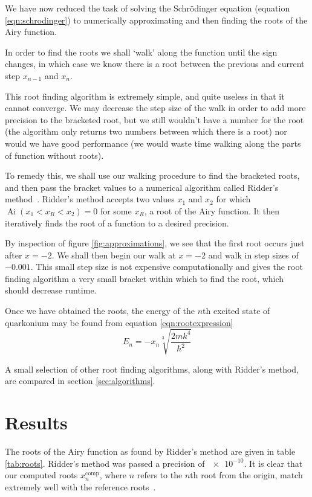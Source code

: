 \documentclass[]{article}
\newcommand{\Ai}[1]{\ensuremath{\operatorname{Ai}({#1})}}
\begin{document}
We have now reduced the task of solving the Schr\"{o}dinger equation (equation \ref{eqn:schrodinger}) to numerically approximating and then finding the roots of the Airy function.

In order to find the roots we shall `walk' along the function until the sign changes, in which case we know there is a root between the previous and current step $x_{n-1}$ and $x_{n}$.

This root finding algorithm is extremely simple, and quite useless in that it cannot converge. We may decrease the step size of the walk in order to add more precision to the bracketed root, but we still wouldn't have a number for the root (the algorithm only returns two numbers between which there is a root) nor would we have good performance (we would waste time walking along the parts of function without roots).

To remedy this, we shall use our walking procedure to find the bracketed roots, and then pass the bracket values to a numerical algorithm called Ridder's method~\cite{ref:nr}. Ridder's method accepts two values $x_{1}$ and $x_{2}$ for which $\Ai{x_{1} < x_{R} < x_{2}} = 0$ for some $x_{R}$, a root of the Airy function. It then iteratively finds the root of a function to a desired precision.

By inspection of figure \ref{fig:approximations}, we see that the first root occurs just after $x = -2$. We shall then begin our walk at $x = -2$ and walk in step sizes of $-0.001$. This small step size is not expensive computationally and gives the root finding algorithm a very small bracket within which to find the root, which should decrease runtime. 

Once we have obtained the roots, the energy of the $n$th excited state of quarkonium may be found from equation \ref{eqn:rootexpression}
\begin{equation}
E_{n} = -x_{n} \sqrt[3]{\frac{2mk^{4}}{\hbar^{2}}}
\end{equation}

A small selection of other root finding algorithms, along with Ridder's method, are compared in section \ref{sec:algorithms}.



\section{Results}\label{sec:results}

The roots of the Airy function as found by Ridder's method are given in table \ref{tab:roots}.   Ridder's method was passed a precision of $\num{e-10}$. It is clear that our computed roots $x_{n}^{\mathrm{comp}}$, where $n$ refers to the $n$th root from the origin, match extremely well with the reference roots~\cite{ref:abramowitz}.
\end{document}
